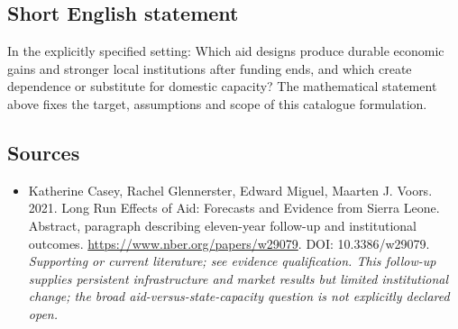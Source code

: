 \documentclass[11pt]{article}
\begin{document}
\subsection{Short English statement}
In the explicitly specified setting: Which aid designs produce durable economic gains and stronger local institutions after funding ends, and which create dependence or substitute for domestic capacity? The mathematical statement above fixes the target, assumptions and scope of this catalogue formulation.

\subsection{Sources}
\begin{itemize}\raggedright
\item[\textnormal{[S1]}]\hypertarget{source:30007657:1}{} Katherine Casey, Rachel Glennerster, Edward Miguel, Maarten J. Voors. 2021. Long Run Effects of Aid: Forecasts and Evidence from Sierra Leone. Abstract, paragraph describing eleven-year follow-up and institutional outcomes.
\url{https://www.nber.org/papers/w29079}.
DOI: 10.3386/w29079.
{\small\textit{Supporting or current literature; see evidence qualification. This follow-up supplies persistent infrastructure and market results but limited institutional change; the broad aid-versus-state-capacity question is not explicitly declared open.}}
\end{itemize}
\end{document}
